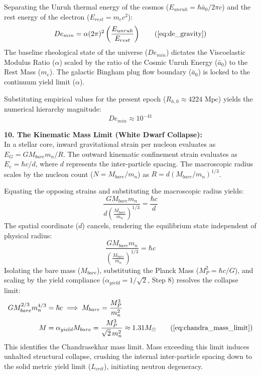 Separating the Unruh thermal energy of the cosmos ($E_{unruh} = \hbar \bar{a}_0 / 2\pi c$) and the rest energy of the electron ($E_{rest} = m_e c^2$):
\begin{equation}
    De_{min} = \alpha (2\pi)^2 \left( \frac{E_{unruh}}{E_{rest}} \right) \tag{\ref{eq:de_gravity}}
\end{equation}
The baseline rheological state of the universe ($De_{min}$) dictates the Viscoelastic Modulus Ratio ($\alpha$) scaled by the ratio of the Cosmic Unruh Energy ($\bar{a}_0$) to the Rest Mass ($m_e$). The galactic Bingham plug flow boundary ($\bar{a}_0$) is locked to the continuum yield limit ($\alpha$).

Substituting empirical values for the present epoch ($R_{h,0} \approx 4224 \text{ Mpc}$) yields the numerical hierarchy magnitude:
\begin{equation}
    De_{min} \approx 10^{-41} 
\end{equation}

\vspace{0.2 cm}

\textbf{10. The Kinematic Mass Limit (White Dwarf Collapse):} \\ 
In a stellar core, inward gravitational strain per nucleon evaluates as $E_G = G M_{bare} m_n / R$. The outward kinematic confinement strain evaluates as $E_e = \hbar c / d$, where $d$ represents the inter-particle spacing. The macroscopic radius scales by the nucleon count ($N = M_{bare}/m_n$) as $R = d (M_{bare}/m_n)^{1/3}$. %

Equating the opposing strains and substituting the macroscopic radius yields:
\begin{equation}
    \frac{G M_{bare} m_n}{d \left( \frac{M_{bare}}{m_n} \right)^{1/3}} = \frac{\hbar c}{d} %
\end{equation}
The spatial coordinate ($d$) cancels, rendering the equilibrium state independent of physical radius:
\begin{equation}
    \frac{G M_{bare} m_n}{\left( \frac{M_{bare}}{m_n} \right)^{1/3}} = \hbar c %
\end{equation}
Isolating the bare mass ($M_{bare}$), substituting the Planck Mass ($M_P^2 = \hbar c / G$), and scaling by the yield compliance ($\alpha_{yield} = 1/\sqrt{2}$, Step 8) resolves the collapse limit: %
\begin{align}
    G M_{bare}^{2/3} m_n^{4/3} &= \hbar c \implies M_{bare} = \frac{M_P^3}{m_n^2} \\ %
    M &= \alpha_{yield} M_{bare} = \frac{M_P^3}{\sqrt{2}\, m_n^2} \approx 1.31 M_\odot \tag{\ref{eq:chandra_mass_limit}} %
\end{align}
This identifies the Chandrasekhar mass limit. Mass exceeding this limit induces unhalted structural collapse, crushing the internal inter-particle spacing down to the solid metric yield limit ($L_{crit}$), initiating neutron degeneracy.

